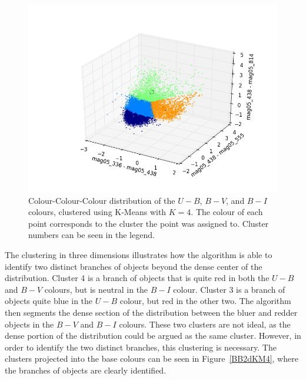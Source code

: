 \begin{figure}[H]
\centering
\includegraphics[width=\linewidth]{figs/kmeans_3d_color_4cl_mag05_336-mag05_438vsmag05_438-mag05_555vsmag05_438-mag05_814}
\caption{Colour-Colour-Colour distribution of the $U - B$, $B - V$, and $B - I$ colours, clustered using K-Means with $K=4$. The colour of each point corresponds to the cluster the point was assigned to. Cluster numbers can be seen in the legend.}
\label{fig:BB3dKM4}
\end{figure}

The clustering in three dimensions illustrates how the algorithm is able to identify two distinct branches of objects beyond the dense center of the distribution.
Cluster 4 is a branch of objects that is quite red in both the $U - B$ and $B - V$ colours, but is neutral in the $B - I$ colour.
Cluster 3 is a branch of objects quite blue in the $U - B$ colour, but red in the other two.
The algorithm then segments the dense section of the distribution between the bluer and redder objects in the $B - V$ and $B - I$ colours.
These two clusters are not ideal, as the dense portion of the distribution could be argued as the same cluster. 
However, in order to identify the two distinct branches, this clustering is necessary.
The clusters projected into the base colours can be seen in Figure~\ref{BB2dKM4}, where the branches of objects are clearly identified.

